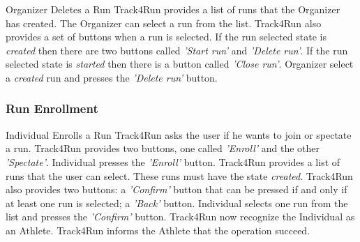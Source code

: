 \documentclass[a4paper]{article}
\begin{document}
        \begin{usecase}{Organizer Deletes a Run}
              {Track4Run provides a list of runs that the Organizer has created. The Organizer can select a run from the list. Track4Run also provides a set of buttons when a run is selected. If the run selected state is \textit{created} then there are two buttons called \textit{'Start run'} and \textit{'Delete run'}. If the run selected state is \textit{started} then there is a button called \textit{'Close run'}.}
              {Organizer select a \textit{created} run and presses the \textit{'Delete run'} button.}
        \end{usecase}
        
        \subsubsection{Run Enrollment}
        
        \begin{usecase}{Individual Enrolls a Run}
              {Track4Run asks the user if he wants to join or spectate a run. Track4Run provides two buttons, one called \textit{'Enroll'} and the other \textit{'Spectate'}.}
              {Individual presses the \textit{'Enroll'} button.}
              {Track4Run provides a list of runs that the user can select. These runs must have the state \textit{created}. Track4Run also provides two buttons: a \textit{'Confirm'} button that can be pressed if and only if at least one run is selected; a \textit{'Back'} button.}
              {Individual selects one run from the list and presses the \textit{'Confirm'} button.}
              {Track4Run now recognize the Individual as an Athlete.}
              {Track4Run informs the Athlete that the operation succeed.}
        \end{usecase}
        
\end{document}
